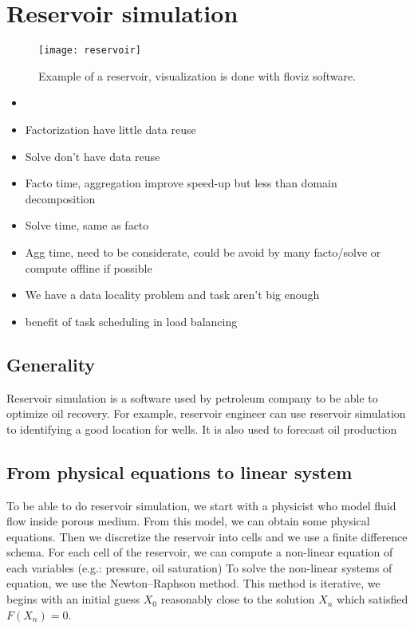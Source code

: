 \section{Reservoir simulation}

\begin{figure}[!ht]
  \centering
  \texttt{[image: reservoir]}
  \caption{Example of a reservoir, visualization is done with floviz software.}
  \label{floviz}
\end{figure}


\begin{itemize}
  \item
  \item Factorization have little data reuse
  \item Solve don't have data reuse
  \item Facto time, aggregation improve speed-up but less than domain decomposition
  \item Solve time, same as facto
  \item Agg time, need to be considerate, could be avoid by many facto/solve or compute offline if possible
  \item We have a data locality problem and task aren't big enough
  \item benefit of task scheduling in load balancing
\end{itemize}

\subsection{Generality}
Reservoir simulation is a software used by petroleum company to be able to optimize oil recovery.
%
For example, reservoir engineer can use reservoir simulation to identifying a good location for wells.
%
It is also used to forecast oil production


\subsection{From physical equations to linear system}
To be able to do reservoir simulation, we start with a physicist who model fluid flow inside porous medium.
%
From this model, we can obtain some physical equations.
%
Then we discretize the reservoir into cells and we use a finite difference schema.
%
For each cell of the reservoir, we can compute a non-linear equation of each variables (e.g.: pressure, oil saturation)
%
To solve the non-linear systems of equation, we use the Newton–Raphson method.
%
This method is iterative, we begins with an initial guess $X_0$ reasonably close to the solution $X_n$ which satisfied $F(X_n) = 0$.

